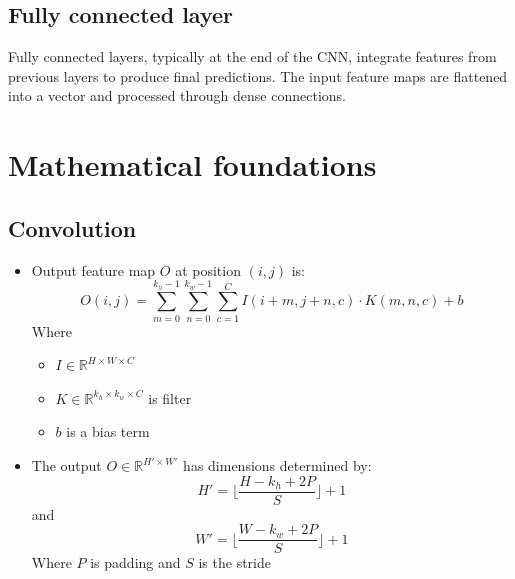 \documentclass[journal]{IEEEtran} %
\begin{document}


\subsection{Fully connected layer}
Fully connected layers, typically at the end of the CNN, integrate features from previous layers to produce final predictions. The input feature maps are flattened into a vector and processed through dense connections.


\section{Mathematical foundations}

\subsection{Convolution}
\begin{itemize}
    \item Output feature map \(O\) at position $(i,j)$ is:
        \begin{equation}
        O(i,j) = \sum_{m=0}^{k_h-1} \sum_{n=0}^{k_w-1} \sum_{c=1}^{C} I(i+m, j+n, c) \cdot K(m, n, c) + b
        \end{equation}
        Where
        \begin{itemize}
            \item \(I \in \mathbb{R}^{H \times W \times C} \)
            \item $K \in \mathbb{R}^{k_h \times k_w \times C}$ is filter
            \item $b$ is a bias term
        \end{itemize}

    \item The output $O \in \mathbb{R}^{H' \times W'}$ has dimensions determined by:
        \begin{equation}
        H' = \lfloor \frac{H - k_h + 2P}{S} \rfloor + 1
        \end{equation}
        and
        \begin{equation}
        W' = \lfloor \frac{W - k_w + 2P}{S} \rfloor + 1
        \end{equation}
        Where $P$ is padding and $S$ is the stride
\end{itemize}
\end{document}

